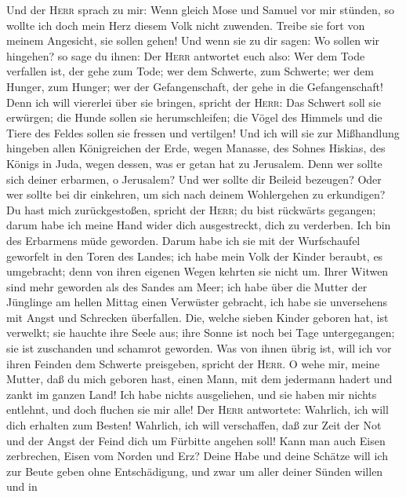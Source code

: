  Und der \textsc{Herr} sprach zu mir: Wenn gleich Mose und
Samuel vor mir stünden, so wollte ich doch mein Herz diesem Volk nicht
zuwenden. Treibe sie fort von meinem Angesicht, sie sollen gehen!
 Und wenn sie zu dir sagen: Wo sollen wir hingehen? so
sage du ihnen: Der \textsc{Herr} antwortet euch also: Wer dem Tode
verfallen ist, der gehe zum Tode; wer dem Schwerte, zum Schwerte; wer
dem Hunger, zum Hunger; wer der Gefangenschaft, der gehe in die
Gefangenschaft!  Denn ich will viererlei über sie bringen,
spricht der \textsc{Herr}: Das Schwert soll sie erwürgen; die Hunde
sollen sie herumschleifen; die Vögel des Himmels und die Tiere des
Feldes sollen sie fressen und vertilgen!  Und ich will sie
zur Mißhandlung hingeben allen Königreichen der Erde, wegen Manasse, des
Sohnes Hiskias, des Königs in Juda, wegen dessen, was er getan hat zu
Jerusalem.  Denn wer sollte sich deiner erbarmen, o
Jerusalem? Und wer sollte dir Beileid bezeugen? Oder wer sollte bei dir
einkehren, um sich nach deinem Wohlergehen zu erkundigen? 
Du hast mich zurückgestoßen, spricht der \textsc{Herr}; du bist
rückwärts gegangen; darum habe ich meine Hand wider dich ausgestreckt,
dich zu verderben. Ich bin des Erbarmens müde geworden. 
Darum habe ich sie mit der Wurfschaufel geworfelt in den Toren des
Landes; ich habe mein Volk der Kinder beraubt, es umgebracht; denn von
ihren eigenen Wegen kehrten sie nicht um.  Ihrer Witwen
sind mehr geworden als des Sandes am Meer; ich habe über die Mutter der
Jünglinge am hellen Mittag einen Verwüster gebracht, ich habe sie
unversehens mit Angst und Schrecken überfallen.  Die,
welche sieben Kinder geboren hat, ist verwelkt; sie hauchte ihre Seele
aus; ihre Sonne ist noch bei Tage untergegangen; sie ist zuschanden und
schamrot geworden. Was von ihnen übrig ist, will ich vor ihren Feinden
dem Schwerte preisgeben, spricht der \textsc{Herr}.  O
wehe mir, meine Mutter, daß du mich geboren hast, einen Mann, mit dem
jedermann hadert und zankt im ganzen Land! Ich habe nichts ausgeliehen,
und sie haben mir nichts entlehnt, und doch fluchen sie mir alle!
 Der \textsc{Herr} antwortete: Wahrlich, ich will dich
erhalten zum Besten! Wahrlich, ich will verschaffen, daß zur Zeit der
Not und der Angst der Feind dich um Fürbitte angehen soll!
 Kann man auch Eisen zerbrechen, Eisen vom Norden und
Erz?  Deine Habe und deine Schätze will ich zur Beute
geben ohne Entschädigung, und zwar um aller deiner Sünden willen und in
